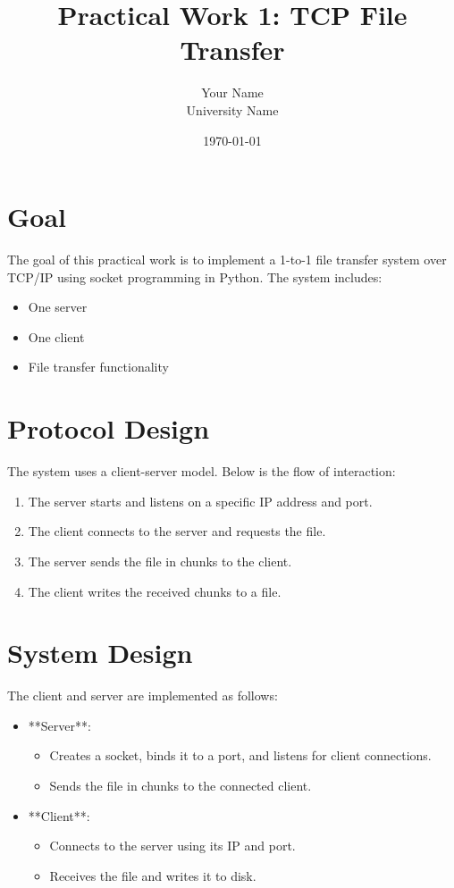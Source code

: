 \documentclass[a4paper,12pt]{article}
\title{Practical Work 1: TCP File Transfer}
\author{Your Name \\ University Name}
\date{\today}
\begin{document}
\maketitle

\section*{Goal}
The goal of this practical work is to implement a 1-to-1 file transfer system over TCP/IP using socket programming in Python. The system includes:
\begin{itemize}
    \item One server
    \item One client
    \item File transfer functionality
\end{itemize}

\section*{Protocol Design}
The system uses a client-server model. Below is the flow of interaction:
\begin{enumerate}
    \item The server starts and listens on a specific IP address and port.
    \item The client connects to the server and requests the file.
    \item The server sends the file in chunks to the client.
    \item The client writes the received chunks to a file.
\end{enumerate}

\section*{System Design}
The client and server are implemented as follows:
\begin{itemize}
    \item **Server**:
          \begin{itemize}
              \item Creates a socket, binds it to a port, and listens for client connections.
              \item Sends the file in chunks to the connected client.
          \end{itemize}
    \item **Client**:
          \begin{itemize}
              \item Connects to the server using its IP and port.
              \item Receives the file and writes it to disk.
          \end{itemize}
\end{itemize}
\end{document}
